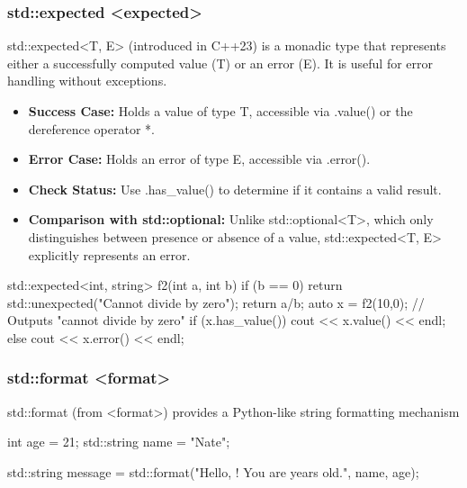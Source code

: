\documentclass{report}
\begin{document}
     \bigbreak \noindent 
     \subsubsection{std::expected <expected>}
     \bigbreak \noindent 
     std::expected<T, E> (introduced in C++23) is a monadic type that represents either a successfully computed value (T) or an error (E). It is useful for error handling without exceptions.
     \bigbreak \noindent 
     \begin{itemize}
         \item \textbf{Success Case:} Holds a value of type T, accessible via .value() or the dereference operator *.
         \item \textbf{Error Case:} Holds an error of type E, accessible via .error().
         \item \textbf{Check Status:} Use .has\_value() to determine if it contains a valid result.
         \item \textbf{Comparison with std::optional:} Unlike std::optional<T>, which only distinguishes between presence or absence of a value, std::expected<T, E> explicitly represents an error.
     \end{itemize}

     \bigbreak \noindent 
     \begin{cppcode}
         std::expected<int, string> f2(int a, int b) {
             if (b == 0) return std::unexpected("Cannot divide by zero");
             return a/b;
         }
         auto x = f2(10,0);
         // Outputs "cannot divide by zero"
         if (x.has_value()) {
             cout << x.value() << endl;
         } else {
             cout << x.error() << endl;
         }
     \end{cppcode}

     \bigbreak \noindent 
     \subsubsection{std::format <format>}
     \bigbreak \noindent 
     std::format (from <format>) provides a Python-like string formatting mechanism
     \bigbreak \noindent 
     \begin{cppcode}
         int age = 21;
         std::string name = "Nate";

         std::string message = std::format("Hello, {}! You are {} years old.", name, age);
     \end{cppcode}

     \bigbreak \noindent 
\end{document}

